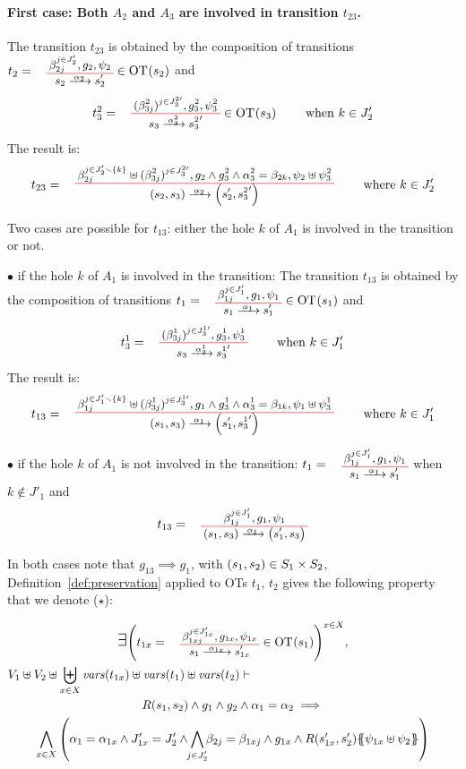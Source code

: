 \documentclass[runningheads]{llncs}
\begin{document}
\begin{enumerate}
\paragraph{First case: Both $A_2$ and $A_3$ are involved in transition $t_{23}$.}
The transition $t_{23}$ is obtained by the composition of  transitions $t_2=\OTx{2}{}{2}{2}\in\fOT{s_2}$ and  \[t_3^2=
\OT{ s_3}{{s^2_3}'}{\alpha_3^2}{   {(\beta^2_{3j})^{j \in J^{2 \prime}_3} }}{ g^2_3 }{ \psi^2_3}\in\fOT{s_3} \qquad \text{ when } k \in J'_{2} 
\] The result is:
\[
t_{23} = \OT{\mpar{s_2, s_3}}{\mpar{s'_2, {s^2_3}'}}{\alpha_2}{\beta_{2j}^{j \in J'_2 \setminus \{k\}} \uplus  {(\beta^2_{3j})^{j \in J^{2 \prime}_3} }}{g_2 \wedge g^2_3 \wedge \alpha^2_3 = \beta_{2k}}{\psi_2 \uplus \psi^2_3} \qquad \text{ where } k \in J'_{2} 
\]

Two cases are possible for $t_{13}$: either the hole $k$ of $A_1$ is involved in the transition or not.

$\bullet$ if  the hole $k$ of $A_1$ is involved in the transition: 
The transition $t_{13}$ is obtained by the composition of  transitions $t_1=\OTx{1}{}{1}{1}\in\fOT{s_1}$ and  \[t_3^1=
\OT{ s_3}{{s^1_3}'}{\alpha_3^1}{   {(\beta^1_{3j})^{j \in J^{1 \prime}_3} }}{ g^1_3 }{ \psi^1_3} \qquad \text{ when } k \in J'_{1} 
\] The result is:
\[
t_{13} = \OT{\mpar{s_1, s_3}}{\mpar{s'_1, {s^1_3}'}}{\alpha_1}{\beta_{1j}^{j \in J'_1 \setminus \{k\}} \uplus  {(\beta^1_{3j})^{j \in J^{1 \prime}_3} }}{g_1 \wedge g^1_3 \wedge \alpha^1_3 = \beta_{1k}}{\psi_1 \uplus \psi^1_3} \qquad \text{ where } k \in J'_{1} 
\]

$\bullet$ if  the hole $k$ of $A_1$ is not involved in the transition:
$t_1=\OTx{1}{}{1}{1}$ when  $k \not\in J'_{1} $
and 
\[
t_{13} = \OT{\mpar{s_1, s_3}}{\mpar{s'_1, {s_3}}}{\alpha_1}{\beta_{1j}^{j \in J'_1}}{g_1}{\psi_1}
\]

\smallskip
In both cases note that $g_{13} \implies g_1$, with  ${\left(s_1, s_2\right)} \in S_1 \times S_2$, Definition~\ref{def:preservation} applied to OTs $t_1,\,t_2$ gives the following property that we denote ($\star$):

\begin{multline*}
\bigexists 
\mpar{t_{1x} = \OTx{1}{x}{1x}{1x} \in \fOT{s_1}}^{x \in X},\\
  V_1 \uplus V_2 \uplus \biguplus_{x\in X}\fvars{t_{1x}} \uplus \fvars{t_1} \uplus \fvars{t_2} \vdash \hspace{6cm}\\  R\mpar{s_1, s_2} \wedge 	g_1 \wedge g_2 \wedge \alpha_1 = \alpha_2 
\implies \\
\bigwedge_{x\in X}
\mpar{
\alpha_1=\alpha_{1 x}  \land J'_{1x}= J'_2 \land \bigwedge_\subbox{j \in J'_2 } \beta_{2j} = \beta_{1xj}\land g_{1 x}\land
 R\mpar{s'_{1 x}, s'_2}\psubst{\psi_{1 x} \uplus \psi_2}}
\end{multline*}


\end{enumerate}
\end{document}
